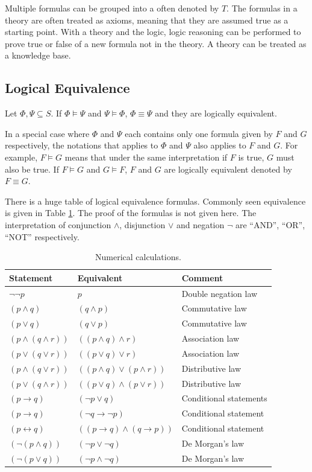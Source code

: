 Multiple formulas can be grouped into a  often denoted by $T$. The formulas in a theory are often treated as axioms, meaning that they are assumed true as a starting point. With a theory and the logic, logic reasoning can be performed to prove true or false of a new formula not in the theory. A theory can be treated as a knowledge base.

\subsection{Logical Equivalence}

Let $\Phi, \Psi \subseteq S$. If $\Phi \models \Psi$ and $\Psi \models \Phi$, $\Phi \equiv \Psi$ and they are logically equivalent.

In a special case where $\Phi$ and $\Psi$ each contains only one formula given by $F$ and $G$ respectively, the notations that applies to $\Phi$ and $\Psi$ also applies to $F$ and $G$. For example, $F\models G$ means that under the same interpretation if $F$ is true, $G$ must also be true. If $F \models G$ and $G \models F$, $F$ and $G$ are logically equivalent denoted by $F\equiv G$.

There is a huge table of logical equivalence formulas. Commonly seen equivalence is given in Table \ref{tab:logicalequivalence}. The proof of the formulas is not given here. The interpretation of conjunction $\land$, disjunction $\lor$ and negation $\neg$ are ``AND'', ``OR'', ``NOT'' respectively.
\begin{table}[!htb]
	\centering \caption{Numerical calculations.} \label{tab:logicalequivalence}
	\begin{tabularx}{\textwidth}{llX}
		\hline
		Statement & Equivalent & Comment \\
		\hline
		$\neg \neg p$ & $p$ & Double negation law \\
		$(p \land q)$ & $(q \land p)$ & Commutative law \\
		$(p \lor q)$ & $(q \lor p)$ & Commutative law \\
		$(p \land (q \land r))$ & $((p \land q) \land r)$ & Association law \\
		$(p \lor (q \lor r))$ & $((p \lor q) \lor r)$ & Association law \\
		$(p \land (q \lor r))$ & $((p \land q) \lor (p \land r))$ & Distributive law \\
		$(p \lor (q \land r))$ & $((p \lor q) \land (p \lor r))$ & Distributive law \\
		$(p \rightarrow q)$ & $(\neg p \lor q)$ & Conditional statements \\
		$(p \rightarrow q)$ & $(\neg q \rightarrow \neg p)$ & Conditional statement \\
		$(p \leftrightarrow q)$ & $((p \rightarrow q) \land (q \rightarrow p))$ & Conditional statement \\
		$(\neg (p \land q))$ & $(\neg p \lor \neg q)$ & De Morgan's law \\
		$(\neg (p \lor q))$ & $(\neg p \land \neg q)$ & De Morgan's law \\
		\hline
	\end{tabularx}
\end{table}

